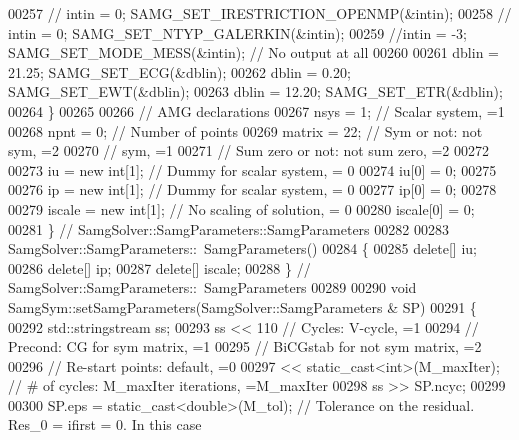 \begin{DoxyCode}
00257 \textcolor{comment}{//        intin = 0;     SAMG\_SET\_IRESTRICTION\_OPENMP(&intin);}
00258 \textcolor{comment}{//        intin = 0;     SAMG\_SET\_NTYP\_GALERKIN(&intin);}
00259         \textcolor{comment}{//intin = -3;    SAMG\_SET\_MODE\_MESS(&intin); // No output at all}
00260 
00261         dblin = 21.25; SAMG\_SET\_ECG(&dblin);
00262         dblin = 0.20;  SAMG\_SET\_EWT(&dblin);
00263         dblin = 12.20; SAMG\_SET\_ETR(&dblin);
00264     \}
00265 
00266     \textcolor{comment}{// AMG declarations}
00267     nsys    = 1;            \textcolor{comment}{// Scalar system, =1}
00268     npnt    = 0;            \textcolor{comment}{// Number of points}
00269     matrix = 22;         \textcolor{comment}{// Sym or not: not sym, =2}
00270                             \textcolor{comment}{//             sym, =1}
00271                             \textcolor{comment}{// Sum zero or not: not sum zero, =2}
00272 
00273     iu      = \textcolor{keyword}{new} \textcolor{keywordtype}{int}[1];   \textcolor{comment}{// Dummy for scalar system, = 0}
00274     iu[0]   = 0;
00275 
00276     ip      = \textcolor{keyword}{new} \textcolor{keywordtype}{int}[1];   \textcolor{comment}{// Dummy for scalar system, = 0}
00277     ip[0]   = 0;
00278 
00279     iscale  = \textcolor{keyword}{new} \textcolor{keywordtype}{int}[1];   \textcolor{comment}{// No scaling of solution, = 0}
00280     iscale[0] = 0;
00281 \} \textcolor{comment}{// SamgSolver::SamgParameters::SamgParameters}
00282 
00283 SamgSolver::SamgParameters::~SamgParameters()
00284 \{
00285     \textcolor{keyword}{delete}[] iu;
00286     \textcolor{keyword}{delete}[] ip;
00287     \textcolor{keyword}{delete}[] iscale;
00288 \} \textcolor{comment}{// SamgSolver::SamgParameters::~SamgParameters}
00289 
00290 \textcolor{keywordtype}{void} SamgSym::setSamgParameters(SamgSolver::SamgParameters & SP)
00291 \{
00292     std::stringstream ss;
00293     ss << 110           \textcolor{comment}{// Cycles: V-cycle, =1}
00294                         \textcolor{comment}{// Precond: CG for sym matrix, =1}
00295                         \textcolor{comment}{//          BiCGstab for not sym matrix, =2}
00296                         \textcolor{comment}{// Re-start points: default, =0}
00297        << \textcolor{keyword}{static\_cast<}\textcolor{keywordtype}{int}\textcolor{keyword}{>}(M\_maxIter);  \textcolor{comment}{// # of cycles: M\_maxIter iterations, =M\_maxIter}
00298     ss >> SP.ncyc;
00299 
00300     SP.eps = \textcolor{keyword}{static\_cast<}\textcolor{keywordtype}{double}\textcolor{keyword}{>}(M\_tol); \textcolor{comment}{// Tolerance on the residual. Res\_0 = ifirst = 0. In this case
}
\end{DoxyCode}
